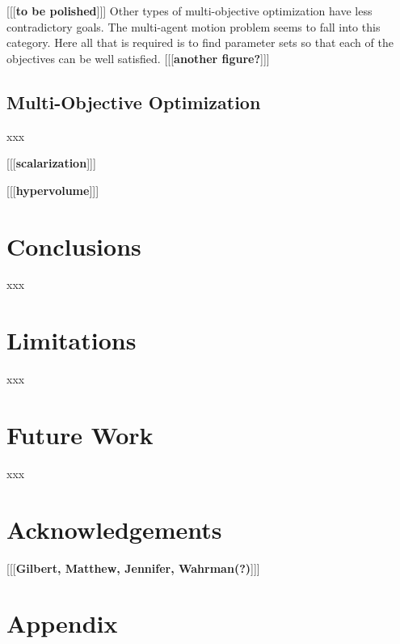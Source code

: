 \documentclass[letterpaper]{article}
\begin{document}
[[[\textbf{to be polished}]]] Other types of multi-objective optimization have less contradictory goals. The multi-agent motion problem seems to fall into this category. Here all that is required is to find parameter sets so that each of the objectives can be well satisfied. [[[\textbf{another figure?}]]]

\subsection{Multi-Objective Optimization}
\label{subsec:Multi-Objective}

xxx

[[[\textbf{scalarization}]]]

[[[\textbf{hypervolume}]]]

\section{Conclusions}
\label{sec:Conclusions}

xxx

\section{Limitations}
\label{sec:limitations}

xxx

\section{Future Work}
\label{sec:future}

xxx

\section{Acknowledgements}
\label{sec:ack}

[[[\textbf{Gilbert, Matthew, Jennifer, Wahrman(?)}]]]







\appendix
\onecolumn
\section{Appendix}
\label{sec:appendix}
\end{document}
